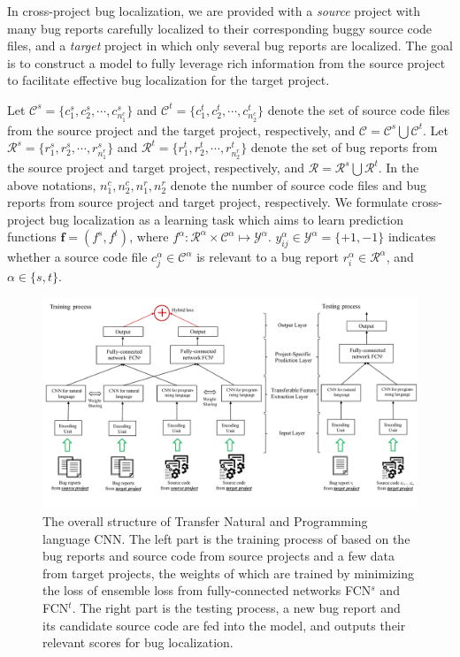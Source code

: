In cross-project bug localization, we are provided with a \emph{source} project with many bug reports carefully localized to their corresponding buggy source code files, and a \emph{target} project in which only several bug reports are localized. The goal is to construct a model to fully leverage rich information from the source project to facilitate effective bug localization for the target project.

Let $\mathcal{C}^s = \{ { c^s_1, c^s_2}, \cdots, c^s_{n^c_1} \} $ and $\mathcal{C}^t =\{ c^t_1, c^t_2, \cdots, c^t_{n^c_2} \}$ denote the set of source code files from the source project and the target project, respectively, and $\mathcal{C}=\mathcal{C}^s \bigcup \mathcal{C}^t $. Let $\mathcal{R}^s =\{r^s_1, r^s_2, \cdots, r^s_{n^r_1}\}$ and $\mathcal{R}^t =\{ r^t_1, r^t_2, \cdots, r^t_{n^r_2}\}$ denote the set of bug reports from the source project and target project, respectively, and $\mathcal{R}=\mathcal{R}^s \bigcup \mathcal{R}^t $. In the above notations, $n^c_1, n^c_2, n^r_1, n^r_2$ denote the number of source code files and bug reports from source project and target project, respectively. We formulate cross-project bug localization as a learning task which aims to learn prediction functions $\mathbf{f}=(f^s,f^t)$, where $f^\alpha: \mathcal{R}^\alpha \times \mathcal{C}^\alpha \mapsto \mathcal{Y}^\alpha$. $y^\alpha_{ij} \in \mathcal{Y}^\alpha = \{+1, -1\}$ indicates whether a source code file $c^\alpha_j \in \mathcal{C}^\alpha $ is relevant to a bug report $r^\alpha_i \in \mathcal{R}^\alpha$, and $\alpha \in \{s,t\}$.   %


\begin{figure}[hbt]
\centering
\includegraphics[width = 2\columnwidth]{pic/structure.pdf}
\caption{The overall structure of Transfer Natural and Programming language CNN.  The left part is the training process of \TRANPCNN based on the bug reports and source code from source projects and a few data from target projects, the weights of which are trained by minimizing the loss of ensemble loss from fully-connected networks FCN$^s$ and FCN$^t$. The right part is the testing process, a new bug report and its candidate source code are fed into the model, and \TRANPCNN outputs their relevant scores for bug localization.}
\label{fig:structure}
\end{figure}

